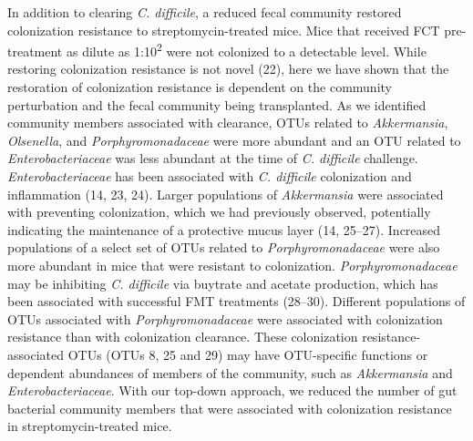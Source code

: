 \documentclass[
  12pt,
]{article}
\begin{document}
In addition to clearing \emph{C. difficile}, a reduced fecal community
restored colonization resistance to streptomycin-treated mice. Mice that
received FCT pre-treatment as dilute as 1:10\textsuperscript{2} were not
colonized to a detectable level. While restoring colonization resistance
is not novel (22), here we have shown that the restoration of
colonization resistance is dependent on the community perturbation and
the fecal community being transplanted. As we identified community
members associated with clearance, OTUs related to \emph{Akkermansia},
\emph{Olsenella}, and \emph{Porphyromonadaceae} were more abundant and
an OTU related to \emph{Enterobacteriaceae} was less abundant at the
time of \emph{C. difficile} challenge. \emph{Enterobacteriaceae} has
been associated with \emph{C. difficile} colonization and inflammation
(14, 23, 24). Larger populations of \emph{Akkermansia} were associated
with preventing colonization, which we had previously observed,
potentially indicating the maintenance of a protective mucus layer (14,
25--27). Increased populations of a select set of OTUs related to
\emph{Porphyromonadaceae} were also more abundant in mice that were
resistant to colonization. \emph{Porphyromonadaceae} may be inhibiting
\emph{C. difficile} via buytrate and acetate production, which has been
associated with successful FMT treatments (28--30). Different
populations of OTUs associated with \emph{Porphyromonadaceae} were
associated with colonization resistance than with colonization
clearance. These colonization resistance-associated OTUs (OTUs 8, 25 and
29) may have OTU-specific functions or dependent abundances of members
of the community, such as \emph{Akkermansia} and
\emph{Enterobacteriaceae}. With our top-down approach, we reduced the
number of gut bacterial community members that were associated with
colonization resistance in streptomycin-treated mice.
\end{document}
